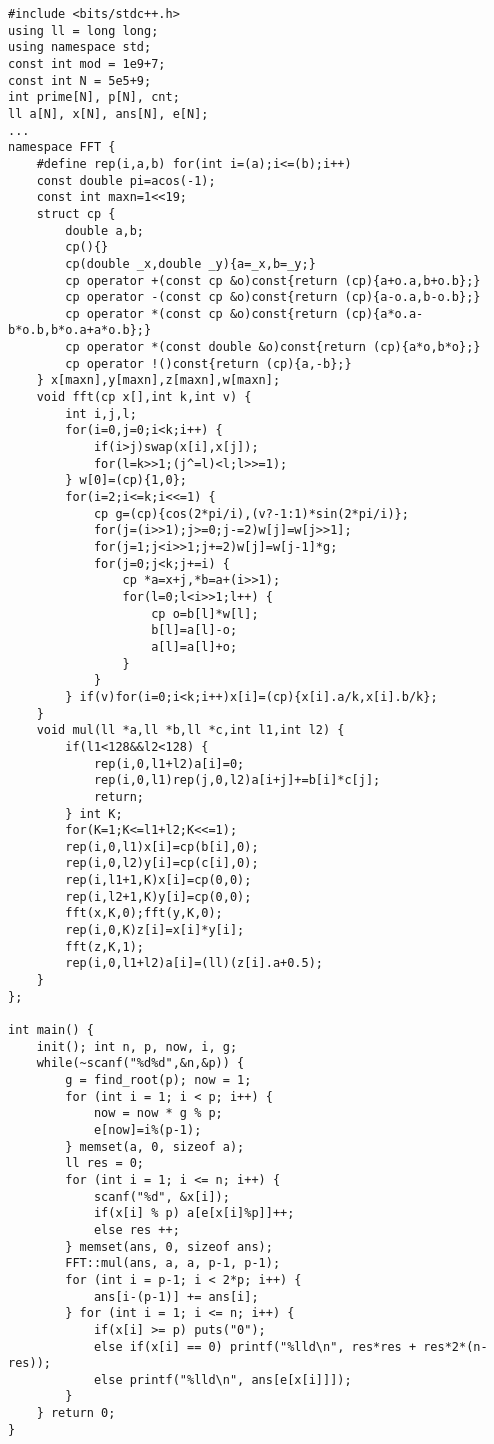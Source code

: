 \begin{lstlisting}
#include <bits/stdc++.h>
using ll = long long;
using namespace std;
const int mod = 1e9+7;
const int N = 5e5+9;
int prime[N], p[N], cnt;
ll a[N], x[N], ans[N], e[N];
...
namespace FFT {
    #define rep(i,a,b) for(int i=(a);i<=(b);i++)
    const double pi=acos(-1);
    const int maxn=1<<19;
    struct cp {
        double a,b;
        cp(){}
        cp(double _x,double _y){a=_x,b=_y;}
        cp operator +(const cp &o)const{return (cp){a+o.a,b+o.b};}
        cp operator -(const cp &o)const{return (cp){a-o.a,b-o.b};}
        cp operator *(const cp &o)const{return (cp){a*o.a-b*o.b,b*o.a+a*o.b};}
        cp operator *(const double &o)const{return (cp){a*o,b*o};}
        cp operator !()const{return (cp){a,-b};}
    } x[maxn],y[maxn],z[maxn],w[maxn];
    void fft(cp x[],int k,int v) {
        int i,j,l;
        for(i=0,j=0;i<k;i++) {
            if(i>j)swap(x[i],x[j]);
            for(l=k>>1;(j^=l)<l;l>>=1);
        } w[0]=(cp){1,0};
        for(i=2;i<=k;i<<=1) {
            cp g=(cp){cos(2*pi/i),(v?-1:1)*sin(2*pi/i)};
            for(j=(i>>1);j>=0;j-=2)w[j]=w[j>>1];
            for(j=1;j<i>>1;j+=2)w[j]=w[j-1]*g;
            for(j=0;j<k;j+=i) {
                cp *a=x+j,*b=a+(i>>1);
                for(l=0;l<i>>1;l++) {
                    cp o=b[l]*w[l];
                    b[l]=a[l]-o;
                    a[l]=a[l]+o;
                }
            }
        } if(v)for(i=0;i<k;i++)x[i]=(cp){x[i].a/k,x[i].b/k};
    }
    void mul(ll *a,ll *b,ll *c,int l1,int l2) {
        if(l1<128&&l2<128) {
            rep(i,0,l1+l2)a[i]=0;
            rep(i,0,l1)rep(j,0,l2)a[i+j]+=b[i]*c[j];
            return;
        } int K;
        for(K=1;K<=l1+l2;K<<=1);
        rep(i,0,l1)x[i]=cp(b[i],0);
        rep(i,0,l2)y[i]=cp(c[i],0);
        rep(i,l1+1,K)x[i]=cp(0,0);
        rep(i,l2+1,K)y[i]=cp(0,0);
        fft(x,K,0);fft(y,K,0);
        rep(i,0,K)z[i]=x[i]*y[i];
        fft(z,K,1);
        rep(i,0,l1+l2)a[i]=(ll)(z[i].a+0.5);
    }
};

int main() {
    init(); int n, p, now, i, g;
    while(~scanf("%d%d",&n,&p)) {
        g = find_root(p); now = 1;
        for (int i = 1; i < p; i++) {
            now = now * g % p;
            e[now]=i%(p-1);
        } memset(a, 0, sizeof a);
        ll res = 0;
        for (int i = 1; i <= n; i++) {
            scanf("%d", &x[i]);
            if(x[i] % p) a[e[x[i]%p]]++;
            else res ++;
        } memset(ans, 0, sizeof ans);
        FFT::mul(ans, a, a, p-1, p-1);
        for (int i = p-1; i < 2*p; i++) {
            ans[i-(p-1)] += ans[i];
        } for (int i = 1; i <= n; i++) {
            if(x[i] >= p) puts("0");
            else if(x[i] == 0) printf("%lld\n", res*res + res*2*(n-res));
            else printf("%lld\n", ans[e[x[i]]]);
        }
    } return 0;
}
\end{lstlisting}

